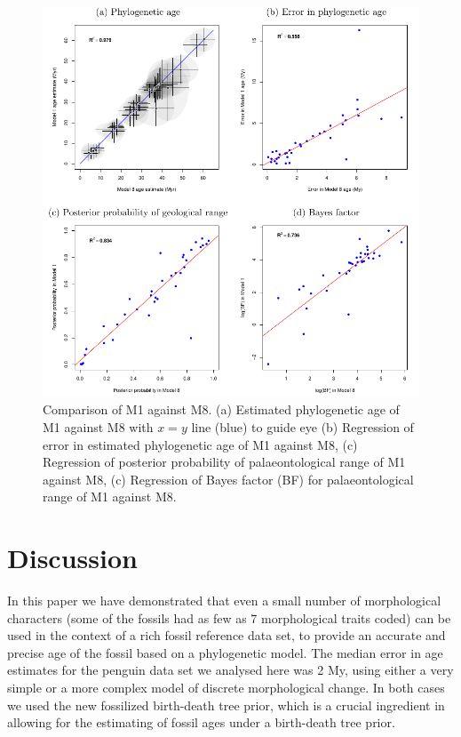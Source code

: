 \documentclass[11pt]{article}
\newcommand{\Mstrict}{{M1}}
\newcommand{\Mrelaxed}{{M8}}
\begin{document}
\begin{figure}
\includegraphics{Figure_comparison.pdf}
\caption{\label{fig:compareM1M8}
Comparison of \Mstrict{} against \Mrelaxed{}. (a) Estimated phylogenetic age of \Mstrict{} against \Mrelaxed{} with $x=y$ line (blue) to guide eye (b) Regression of error in estimated phylogenetic age of \Mstrict{} against \Mrelaxed{}, (c) Regression of posterior probability of palaeontological range of \Mstrict{} against \Mrelaxed{}, (c) Regression of Bayes factor (BF) for palaeontological range of \Mstrict{} against \Mrelaxed{}.}
\end{figure}






\section*{Discussion}

In this paper we have demonstrated that even a small number of morphological characters (some of the fossils had as few as 7 morphological traits coded) can be used in the context of a rich fossil reference data set, to provide an accurate and precise age of the fossil based on a phylogenetic model. The median error in age estimates for the penguin data set we analysed here was 2 My, using either a very simple or a more complex model of discrete morphological change. In both cases we used the new fossilized birth-death tree prior, which is a crucial ingredient in allowing for the estimating of fossil ages under a birth-death tree prior.

\printbibliography
\end{document}
